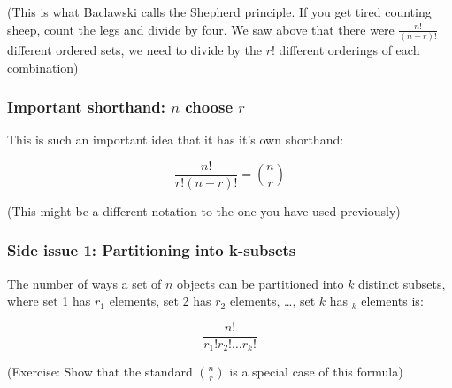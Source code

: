 \documentclass[12pt]{extbook}
\begin{document}
(This is what Baclawski calls the Shepherd principle.   If you get tired counting sheep, count the legs and divide by four.   We saw above that there were $\frac{n!}{(n-r)!}$ different ordered sets, we need to divide by the $r!$ different orderings of each combination)

\subsubsection{Important shorthand: $n$ choose $r$}

This is such an important idea that it has it's own shorthand:

\begin{displaymath}
\frac{n!}{r!(n-r)!} = \binom{n}{r}
\end{displaymath}

(This might be a different notation to the one you have used previously)



\subsubsection{Side issue 1: Partitioning into k-subsets}

The number of ways a set of $n$ objects can be partitioned into $k$ distinct subsets, where set 1 has $r_1$ elements, set 2 has $r_2$ elements, \ldots, set $k$ has $_k$ elements is:

\begin{equation}
\frac{n!}{r_1!r_2! \ldots r_k!}
\end{equation}

(Exercise: Show that the standard $\binom{n}{r}$ is a special case of this formula)



\end{document}
